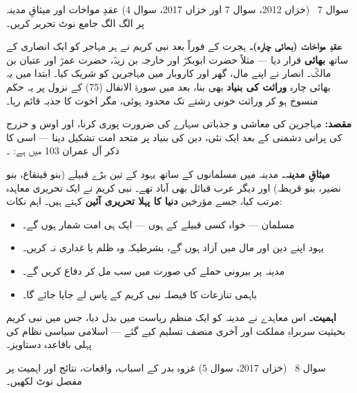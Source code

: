 \begin{sawal}{سوال \textenglish{7} \ \textnormal{\small(خزاں \textenglish{2012}، سوال \textenglish{7} اور خزاں \textenglish{2017}، سوال \textenglish{4})}}
عقدِ مواخات اور میثاقِ مدینہ پر الگ الگ جامع نوٹ تحریر کریں۔
\end{sawal}

\begin{hal}
\textbf{عقدِ مواخات (بھائی چارہ)۔} ہجرت کے فوراً بعد نبی کریم \saw نے ہر
مہاجر کو ایک انصاری کے ساتھ \textbf{بھائی} قرار دیا --- مثلاً حضرت ابوبکرؓ
اور خارجہ بن زیدؓ، حضرت عمرؓ اور عتبان بن مالکؓ۔ انصار نے اپنے مال، گھر
اور کاروبار میں مہاجرین کو شریک کیا۔ ابتدا میں یہ بھائی چارہ \textbf{وراثت
کی بنیاد} بھی بنا، بعد میں سورۃ الانفال (\textenglish{75}) کے نزول پر یہ
حکم منسوخ ہو کر وراثت خونی رشتے تک محدود ہوئی، مگر اخوت کا جذبہ قائم رہا۔

\smallskip
\textbf{مقصد:} مہاجرین کی معاشی و جذباتی سہارے کی ضرورت پوری کرنا، اور
اوس و خزرج کی پرانی دشمنی کے بعد ایک نئی، دین کی بنیاد پر متحد امت تشکیل
دینا --- اسی کا ذکر آل عمران \textenglish{103} میں ہے: ۔

\medskip
\textbf{میثاقِ مدینہ۔} مدینہ میں مسلمانوں کے ساتھ یہود کے تین بڑے قبیلے
(بنو قینقاع، بنو نضیر، بنو قریظہ) اور دیگر عرب قبائل بھی آباد تھے۔ نبی کریم
\saw نے ایک تحریری معاہدہ مرتب کیا، جسے مؤرخین \textbf{دنیا کا پہلا تحریری
آئین} کہتے ہیں۔ اہم نکات:

\begin{itemize}\setlength{\itemsep}{1pt}
  \item مسلمان --- خواہ کسی قبیلے کے ہوں --- ایک ہی امت شمار ہوں گے۔
  \item یہود اپنے دین اور مال میں آزاد ہوں گے، بشرطیکہ وہ ظلم یا غداری نہ
        کریں۔
  \item مدینہ پر بیرونی حملے کی صورت میں سب مل کر دفاع کریں گے۔
  \item باہمی تنازعات کا فیصلہ نبی کریم \saw کے پاس لے جایا جائے گا۔
\end{itemize}

\smallskip
\textbf{اہمیت۔} اس معاہدے نے مدینہ کو ایک منظم ریاست میں بدل دیا، جس میں
نبی کریم \saw بحیثیت سربراہِ مملکت اور آخری منصف تسلیم کیے گئے --- اسلامی
سیاسی نظام کی پہلی باقاعدہ دستاویز۔
\end{hal}

\begin{sawal}{سوال \textenglish{8} \ \textnormal{\small(خزاں \textenglish{2017}، سوال \textenglish{5})}}
غزوہ بدر کے اسباب، واقعات، نتائج اور اہمیت پر مفصل نوٹ لکھیں۔
\end{sawal}

